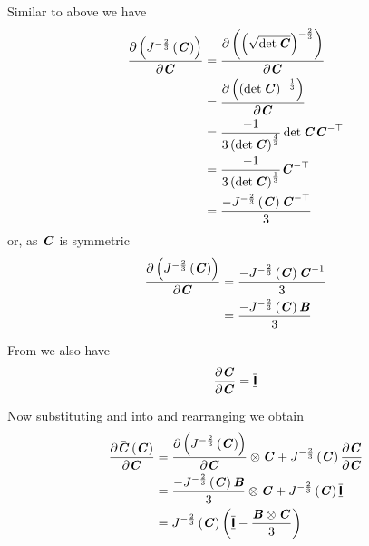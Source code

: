 Similar to above we have
\begin{equation}
  \begin{split}
     \dfrac{\partial \left(  J^{-\frac{2}{3}}\left( \boldsymbol{\mathit{C}} \right)  \right)}{\partial \boldsymbol{\mathit{C}}} &= \dfrac{\partial \left( \left( \sqrt{\det \boldsymbol{\mathit{C}}} \right)^{-\frac{2}{3}} \right)}{\partial \boldsymbol{\mathit{C}}} \\
    &= \dfrac{\partial \left( \left( \det \boldsymbol{\mathit{C}} \right)^{-\frac{1}{3}} \right)}{\partial \boldsymbol{\mathit{C}}} \\
    &=\dfrac{-1}{3\left( \det \boldsymbol{\mathit{C}} \right)^{\frac{4}{3}}}\det \boldsymbol{\mathit{C}} {\boldsymbol{\mathit{C}}}^{- \top } \\
    &=\dfrac{-1}{3\left( \det \boldsymbol{\mathit{C}} \right)^{\frac{1}{3}}} {\boldsymbol{\mathit{C}}}^{- \top } \\
    &=\dfrac{- J^{-\frac{2}{3}}\left( \boldsymbol{\mathit{C}} \right)  {\boldsymbol{\mathit{C}}}^{- \top } }{3}
  \end{split}
\end{equation}
or, as $\boldsymbol{\mathit{C}}$ is symmetric
\begin{equation}
  \begin{split}
    \delby{\pbrac{\fnof{J^{-\frac{2}{3}}}{\tensortwo{C}}}}{\tensortwo{C}}
    &=\dfrac{-\fnof{J^{-\frac{2}{3}}}{\tensortwo{C}}\inverse{\tensortwo{C}}}{3}\\
    &=\dfrac{-\fnof{J^{-\frac{2}{3}}}{\tensortwo{C}}\tensortwo{B}}{3}
  \end{split}
  \label{eqn:DelCBarDelCJacobian}
\end{equation}

From  we also have
\begin{equation}
  \delby{\tensortwo{C}}{\tensortwo{C}}=\symidentitytensorfour
  \label{eqn:DelCBarDelCDeformation}
\end{equation}

Now substituting  and
 into  and
rearranging we obtain
\begin{equation}
  \begin{split}
    \delby{\fnof{\bar{\tensortwo{C}}}{\tensortwo{C}}}{\tensortwo{C}}&=\tensorprod{\delby{\pbrac{\fnof{J^{-\frac{2}{3}}}{\tensortwo{C}}}}{\tensortwo{C}}}{\tensortwo{C}}+\fnof{J^{-\frac{2}{3}}}{\tensortwo{C}}\delby{\tensortwo{C}}{\tensortwo{C}}\\
    &=\tensorprod{\dfrac{-\fnof{J^{-\frac{2}{3}}}{\tensortwo{C}}\tensortwo{B}}{3}}{\tensortwo{C}}+\fnof{J^{-\frac{2}{3}}}{\tensortwo{C}}\symidentitytensorfour\\
    &=\fnof{J^{-\frac{2}{3}}}{\tensortwo{C}}\pbrac{\symidentitytensorfour-\dfrac{\tensorprod{\tensortwo{B}}{\tensortwo{C}}}{3}}
  \end{split}
  \label{eqn:DelCBarDelC}
\end{equation}

